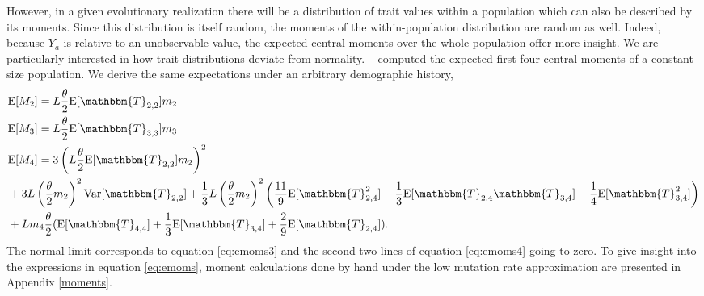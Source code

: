 However, in a given evolutionary realization there will be a distribution of
trait values within a population which can also be described by its moments.
Since this distribution is itself random, the moments of the within-population
distribution are random as well. Indeed, because $Y_a$ is relative to an
unobservable value, the expected central moments over the whole population offer
more insight. We are particularly interested in how trait distributions deviate
from normality. ~\citet{Schraiber2015} computed the expected first four central
moments of a constant-size population. We derive the same expectations under an
arbitrary demographic history,
\begin{subequations} \label{eq:emoms}
\begin{align}
  &\E[M_2] = L \T \E[\mathbbm{T}_{2,2}] m_2 \label{eq:emoms2}\\
  &\E[M_3] = L \T \E[\mathbbm{T}_{3,3}] m_3  \label{eq:emoms3}\\
  &\E[M_4] = 3\left(L \T \E[\mathbbm{T}_{2,2}] m_2\right)^2 \nonumber \\
  &+ 3L \left(\T m_2\right)^2\Var[\mathbbm{T}_{2,2}] + \frac{1}{3}
  L \left(\T m_2\right)^2
    \left( \frac{11}{9} \E[\mathbbm{T}_{2,4}^2]-\frac{1}{3}\E[\mathbbm{T}_{2,4}\mathbbm{T}_{3,4}]-
    \frac{1}{4}\E[\mathbbm{T}_{3,4}^2]\right) \nonumber \\
  &+ L m_4 \T ( \E[\mathbbm{T}_{4,4}] + \frac{1}{3} \E[\mathbbm{T}_{3,4}] +
    \frac{2}{9} \E[\mathbbm{T}_{2,4}] ).
  \label{eq:emoms4}
\end{align}
\end{subequations}
The normal limit corresponds to equation \eqref{eq:emoms3} and the second two
lines of equation \eqref{eq:emoms4} going to zero. To give insight into the
expressions in equation \eqref{eq:emoms}, moment calculations done by hand under
the low mutation rate approximation are presented in Appendix \ref{moments}.

